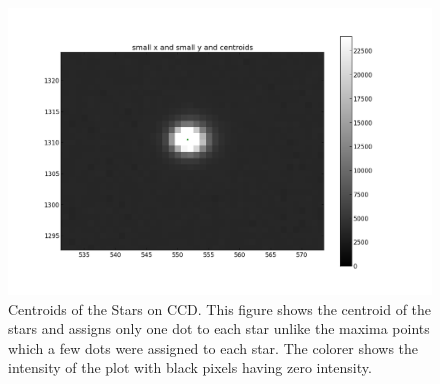 \documentclass[letterpaper,12pt]{article}
\begin{document}
\begin{figure}[h!]
                                                                                                                                                                                                                                                                                                                                                                                                                                                                                                                                                                                                                                                                                                                                                                                                                                                                                                                                                                                                                                                                                  \end{figure}   

\FloatBarrier
\begin{figure}[h!]
\centering
\includegraphics[scale=0.5]{centroid.png}
\caption{Centroids of the Stars on CCD. This figure shows the centroid of the stars and assigns only one dot to each star unlike the maxima points which a few dots were assigned to each star. The colorer shows the intensity of the plot with black pixels having zero intensity.}
\end{figure}
\FloatBarrier
 
\end{document}
